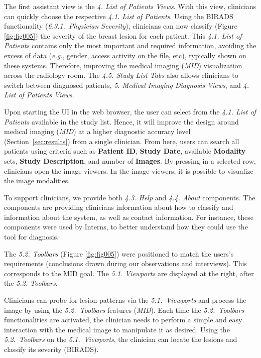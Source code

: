 The first assistant view is the {\it 4. List of Patients Views}.
With this view, clinicians can quickly choose the respective {\it 4.1. List of Patients}.
Using the BIRADS functionality ({\it 6.3.1.~Physician Severity}), clinicians can now classify (Figure \ref{fig:fig005}) the severity of the breast lesion for each patient.
This {\it 4.1. List of Patients} contains only the most important and required information, avoiding the excess of data ({\it e.g.}, gender, access activity on the file, etc), typically shown on these systems.
Therefore, improving the medical imaging ({\it MID}) visualization across the radiology room.
The {\it 4.5. Study List Tabs} also allows clinicians to switch between diagnosed patients, {\it 5. Medical Imaging Diagnosis Views}, and {\it 4. List of Patients Views}.

Upon starting the UI in the web browser, the user can select from the {\it 4.1. List of Patients} available in the study list.
Hence, it will improve the design around medical imaging ({\it MID}) at a higher diagnostic accuracy level (Section~\ref{sec:results}) from a single clinician.
From here, users can search all patients using criteria such as {\bf Patient ID}, {\bf Study Date}, available {\bf Modality} sets, {\bf Study Description}, and number of {\bf Images}.
By pressing in a selected row, clinicians open the image viewers.
In the image viewers, it is possible to visualize the image modalities.

To support clinicians, we provide both {\it 4.3. Help} and {\it 4.4. About} components.
The components are providing clinicians information about how to classify and information about the system, as well as contact information.
For instance, these components were used by Interns, to better understand how they could use the tool for diagnosis.

The {\it 5.2. Toolbars} (Figure \ref{fig:fig005}) were positioned to match the users's requirements (conclusions drawn during our observations and interviews).
This corresponds to the MID goal.
The {\it 5.1. Viewports} are displayed at the right, after the {\it 5.2. Toolbars}.

Clinicians can probe for lesion patterns via the {\it 5.1.~Viewports} and process the image by using the {\it 5.2.~Toolbars} features ({\it MID}).
Each time the {\it 5.2.~Toolbars} functionalities are activated, the clinician needs to perform a simple and easy interaction with the medical image to manipulate it as desired.
Using the {\it 5.2.~Toolbars} on the {\it 5.1.~Viewports}, the clinician can locate the lesions and classify its severity (BIRADS).

